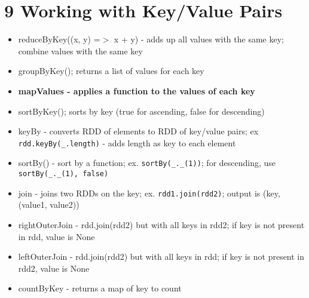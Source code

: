 \documentclass[12pt]{article}
\begin{document}
\section*{9 Working with Key/Value Pairs}
\begin{itemize}
    \item reduceByKey((x, y) =$>$ x + y) - adds up all values with the same key; combine values with the same key
    \item groupByKey(); returns a list of values for each key
    \item \textbf{mapValues - applies a function to the values of each key}
    \item sortByKey(); sorts by key (true for ascending, false for descending)
    \item keyBy - converts RDD of elements to RDD of key/value pairs; ex \texttt{rdd.keyBy(\_.length)} - adds length as key to each element
    \item sortBy() - sort by a function; ex. \texttt{sortBy(\_.\_(1))}; for descending, use \texttt{sortBy(\_.\_(1), false)}
    \item join - joins two RDDs on the key; ex. \texttt{rdd1.join(rdd2)}; output is (key, (value1, value2))
    \item rightOuterJoin - rdd.join(rdd2) but with all keys in rdd2; if key is not present in rdd, value is None
    \item leftOuterJoin - rdd.join(rdd2) but with all keys in rdd; if key is not present in rdd2, value is None
    \item countByKey - returns a map of key to count
\end{itemize}
\end{document}
